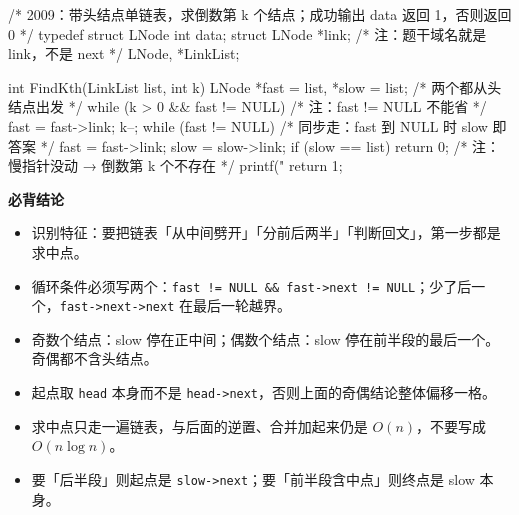 \documentclass[10pt,a4paper]{ctexart}
\begin{document}
\begin{codebox}
/* 2009：带头结点单链表，求倒数第 k 个结点；成功输出 data 返回 1，否则返回 0 */
typedef struct LNode {
    int data;
    struct LNode *link;                    /* 注：题干域名就是 link，不是 next */
} LNode, *LinkList;

int FindKth(LinkList list, int k) {
    LNode *fast = list, *slow = list;      /* 两个都从头结点出发 */
    while (k > 0 && fast != NULL) {        /* 注：fast != NULL 不能省 */
        fast = fast->link;
        k--;
    }
    while (fast != NULL) {                 /* 同步走：fast 到 NULL 时 slow 即答案 */
        fast = fast->link;
        slow = slow->link;
    }
    if (slow == list) return 0;            /* 注：慢指针没动 → 倒数第 k 个不存在 */
    printf("%
    return 1;
}
\end{codebox}





\textbf{必背结论}

\begin{itemize}

\item 识别特征：要把链表「从中间劈开」「分前后两半」「判断回文」，第一步都是求中点。

\item 循环条件必须写两个：\texttt{fast != NULL \&\& fast->next != NULL}；少了后一个，\texttt{fast->next->next} 在最后一轮越界。

\item 奇数个结点：slow 停在正中间；偶数个结点：slow 停在前半段的最后一个。奇偶都不含头结点。

\item 起点取 \texttt{head} 本身而不是 \texttt{head->next}，否则上面的奇偶结论整体偏移一格。

\item 求中点只走一遍链表，与后面的逆置、合并加起来仍是 $O(n)$，不要写成 $O(n\log n)$。

\item 要「后半段」则起点是 \texttt{slow->next}；要「前半段含中点」则终点是 slow 本身。

\end{itemize}
\end{document}
